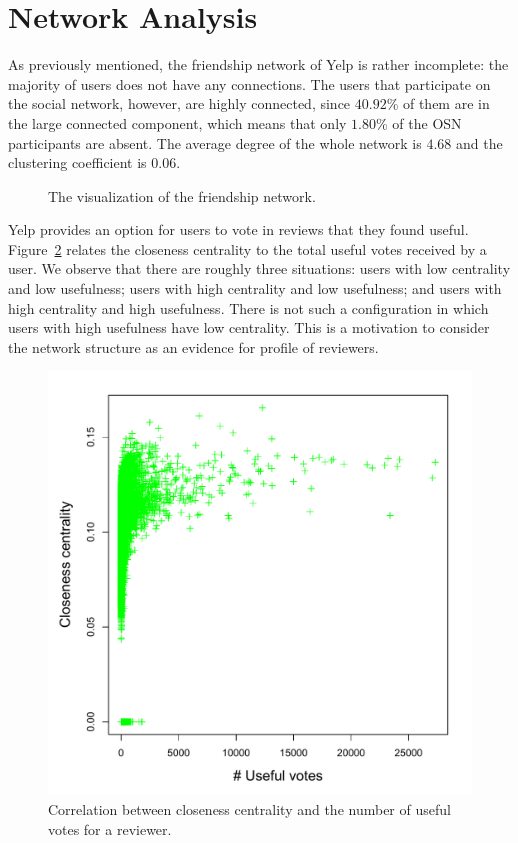 \section{Network Analysis}
As previously mentioned, the friendship network of Yelp is rather incomplete:
the majority of users does not have any connections. The users that participate
on the social network, however, are highly connected, since $40.92$\% of them
are in the large connected component, which means that only $1.80$\% of the OSN
participants are absent. The average degree of the whole network is $4.68$ and
the clustering coefficient is $0.06$.

\begin{figure}[H]
\centering
\caption{The visualization of the friendship network.}
\label{fig:plot}
\end{figure}

Yelp provides an option for users to vote in reviews that they found useful.
Figure~\ref{fig:clo_use} relates the closeness centrality to the total useful
votes received by a user. We observe that there are roughly three situations:
users with low centrality and low usefulness; users with high centrality and low
usefulness; and users with high centrality and high usefulness. There is not
such a configuration in which users with high usefulness have low centrality.
This is a motivation to consider the network structure as an evidence for
profile of reviewers.

\begin{figure}[H]
\centering
\includegraphics[scale=0.5]{img/close_useful_scatter}
\caption{Correlation between closeness centrality and the number of useful votes for a reviewer.}
\label{fig:clo_use}
\end{figure}

